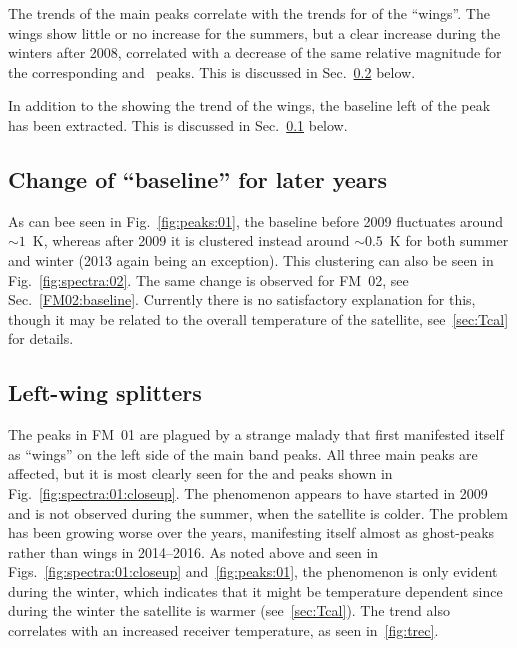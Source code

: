 The trends of the main peaks correlate with the trends for of the ``wings''.
The wings show little or no increase for the summers, but a clear increase
during the winters after 2008, correlated with a decrease of the same relative
magnitude for the corresponding  and ~peaks.  This is
discussed in Sec.~\ref{FM01:leftwings} below.

In addition to the showing the trend of the wings, the baseline left of the
 peak has been extracted.  This is discussed in
Sec.~\ref{FM01:baseline} below.


\subsection{Change of ``baseline'' for later years}
\label{FM01:baseline}
As can bee seen in Fig.~\ref{fig:peaks:01}, the baseline before 2009 fluctuates
around $\sim1$~K, whereas after 2009 it is clustered instead around $\sim0.5$~K
for both summer and winter (2013 again being an exception).  This clustering
can also be seen in Fig.~\ref{fig:spectra:02}.  The same change is observed for
FM~02, see Sec.~\ref{FM02:baseline}.  Currently there is no satisfactory
explanation for this, though it may be related to the overall temperature of
the satellite, see~\ref{sec:Tcal} for details.


\subsection{Left-wing splitters}
\label{FM01:leftwings}
The peaks in FM~01 are plagued by a strange malady that first manifested itself
as ``wings'' on the left side of the main band peaks.  All three main peaks are
affected, but it is most clearly seen for the  and  peaks
shown in Fig.~\ref{fig:spectra:01:closeup}.  The phenomenon appears to have
started in 2009 and is not observed during the summer, when the satellite is
colder.  The problem has been growing worse over the years, manifesting itself
almost as ghost-peaks rather than wings in 2014--2016.  As noted above and seen
in Figs.~\ref{fig:spectra:01:closeup} and~\ref{fig:peaks:01}, the phenomenon is
only evident during the winter, which indicates that it might be temperature
dependent since during the winter the satellite is warmer (see~\ref{sec:Tcal}).
The trend also correlates with an increased receiver temperature, as seen
in~\ref{fig:trec}.

